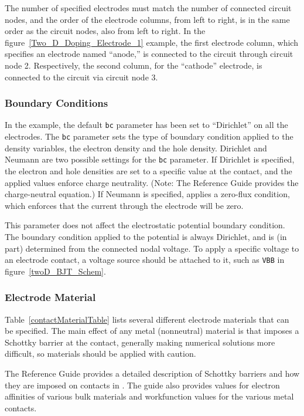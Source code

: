 The number of specified electrodes must match the number of connected 
circuit nodes, and the order of the electrode columns, from left to right,
is in the same order as the circuit nodes, also from left to right.  In 
the figure~\ref{Two_D_Doping_Electrode_1} example, the first electrode column,
which specifies an electrode named ``anode,'' is connected to the circuit 
through circuit node 2.  Respectively, the second column, for the ``cathode'' 
electrode, is connected to the circuit via circuit node 3.

\subsubsection{Boundary Conditions}
In the example, the default \texttt{bc} parameter has been set to ``Dirichlet''
on all the electrodes. The \texttt{bc} parameter sets the type of boundary 
condition applied to the density variables, the electron density and the hole density.
Dirichlet and Neumann are two possible settings for the \texttt{bc} parameter.  
If Dirichlet is specified, the electron and hole densities are set to a specific 
value at the contact, and the applied values enforce charge neutrality.  
(Note: The \Xyce{} Reference Guide\ReferenceGuide{} provides the charge-neutral 
equation.)  If Neumann is specified, \Xyce{} applies a zero-flux condition, 
which enforces that the current through the electrode will be zero.

This parameter does not affect the electrostatic potential boundary condition.
The boundary condition applied to the potential is always Dirichlet, and is
(in part) determined from the connected nodal voltage.  To apply a specific
voltage to an electrode contact, a voltage source should be attached to it,
such as \texttt{VBB} in figure~\ref{twoD_BJT_Schem}.

\subsubsection{Electrode Material}
Table~\ref{contactMaterialTable} lists several different electrode materials that can be specified.   
The main effect of any metal (nonneutral) material is that \Xyce{} imposes a
Schottky barrier at the contact, generally making numerical solutions
more difficult, so materials should be applied with caution.

The \Xyce{} Reference Guide\ReferenceGuide{}
provides a detailed description of Schottky barriers and how they are imposed on contacts in \Xyce{}.
The guide also provides values for electron affinities of various bulk materials and 
workfunction values for the various metal contacts.

